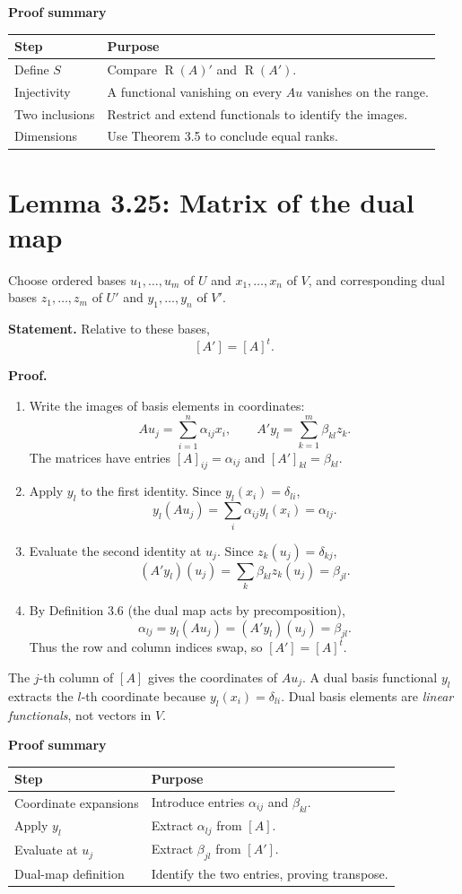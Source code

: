 \documentclass[11pt,a4paper]{article}
\newcommand{\Ran}{\operatorname{R}}
\newenvironment{proofsteps}{\begin{enumerate}\setlength{\itemsep}{4pt}}{\end{enumerate}}
\newcommand{\prooftable}[1]{\medskip\textbf{Proof summary}\par\smallskip #1\medskip}
\begin{document}
\prooftable{\begin{tabularx}{\linewidth}{@{}p{.23\linewidth}X@{}}\hline
Step & Purpose\\\hline
Define \(S\) & Compare \(\Ran(A)'\) and \(\Ran(A')\).\\
Injectivity & A functional vanishing on every \(Au\) vanishes on the range.\\
Two inclusions & Restrict and extend functionals to identify the images.\\
Dimensions & Use Theorem 3.5 to conclude equal ranks.\\\hline
\end{tabularx}}

\section{Lemma 3.25: Matrix of the dual map}
Choose ordered bases \(u_1,\ldots,u_m\) of \(U\) and \(x_1,\ldots,x_n\) of \(V\), and corresponding dual bases \(z_1,\ldots,z_m\) of \(U'\) and \(y_1,\ldots,y_n\) of \(V'\).

\textbf{Statement.} Relative to these bases,
\[
 \boxed{[A']=[A]^t.}
\]

\textbf{Proof.}
\begin{proofsteps}
\item Write the images of basis elements in coordinates:
\[
 Au_j=\sum_{i=1}^{n}\alpha_{ij}x_i,\qquad
 A'y_l=\sum_{k=1}^{m}\beta_{kl}z_k.
\]
The matrices have entries \([A]_{ij}=\alpha_{ij}\) and \([A']_{kl}=\beta_{kl}\).
\item Apply \(y_l\) to the first identity. Since \(y_l(x_i)=\delta_{li}\),
\[
 y_l(Au_j)=\sum_i\alpha_{ij}y_l(x_i)=\alpha_{lj}.
\]
\item Evaluate the second identity at \(u_j\). Since \(z_k(u_j)=\delta_{kj}\),
\[
 (A'y_l)(u_j)=\sum_k\beta_{kl}z_k(u_j)=\beta_{jl}.
\]
\item By Definition 3.6 (the dual map acts by precomposition),
\[
 \alpha_{lj}=y_l(Au_j)=(A'y_l)(u_j)=\beta_{jl}.
\]
Thus the row and column indices swap, so \([A']=[A]^t\).
\end{proofsteps}
\begin{personalnote}
The \(j\)-th column of \([A]\) gives the coordinates of \(Au_j\). A dual basis functional \(y_l\) extracts the \(l\)-th coordinate because \(y_l(x_i)=\delta_{li}\). Dual basis elements are \emph{linear functionals}, not vectors in \(V\).
\end{personalnote}
\prooftable{\begin{tabularx}{\linewidth}{@{}p{.23\linewidth}X@{}}\hline
Step & Purpose\\\hline
Coordinate expansions & Introduce entries \(\alpha_{ij}\) and \(\beta_{kl}\).\\
Apply \(y_l\) & Extract \(\alpha_{lj}\) from \([A]\).\\
Evaluate at \(u_j\) & Extract \(\beta_{jl}\) from \([A']\).\\
Dual-map definition & Identify the two entries, proving transpose.\\\hline
\end{tabularx}}
\end{document}
